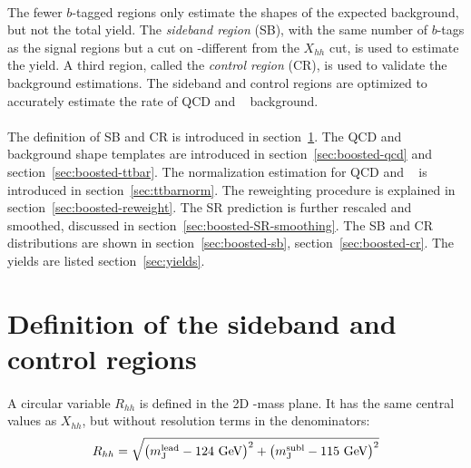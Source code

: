 \paragraph{}
The fewer $b$-tagged regions only estimate the shapes of the expected background, but not the total yield.
The \textit{sideband region} (SB), with the same number of $b$-tags as the signal regions but a cut on \mleadJ-\msublJ different from the $X_{hh}$ cut, is used to estimate the yield.
A third region, called the \textit{control region} (CR), is used to validate the background estimations.
The sideband and control regions are optimized to accurately estimate the rate of QCD and \ttbar~ background. 

\paragraph{}
The definition of SB and CR is introduced in section~\ref{sec:boosted-SBCR}.
The QCD and \ttbar~ background shape templates are introduced in section~\ref{sec:boosted-qcd} and section~\ref{sec:boosted-ttbar}.
The normalization estimation for QCD and \ttbar~ is introduced in section~\ref{sec:ttbarnorm}.
The reweighting procedure is explained in section~\ref{sec:boosted-reweight}.
The SR prediction is further rescaled and smoothed, discussed in section~\ref{sec:boosted-SR-smoothing}.
The SB and CR distributions are shown in section~\ref{sec:boosted-sb}, section~\ref{sec:boosted-cr}. 
The yields are listed section~\ref{sec:yields}.


\section{Definition of the sideband and control regions}
\label{sec:boosted-SBCR}

\paragraph{}
A circular variable $R_{hh}$ is defined in the 2D \mleadJ-\msublJ mass plane. 
It has the same central values as $X_{hh}$, but without resolution terms in the denominators:
\begin{equation}
\label{eq:boosted_RhhDef}
R_{hh} = \sqrt{\left(m^{\rm lead}_{\rm J} - \text{124 GeV}\right)^2 + \left(m^{\rm subl}_{\rm J} - \text{115 GeV}\right)^2}
\end{equation}

